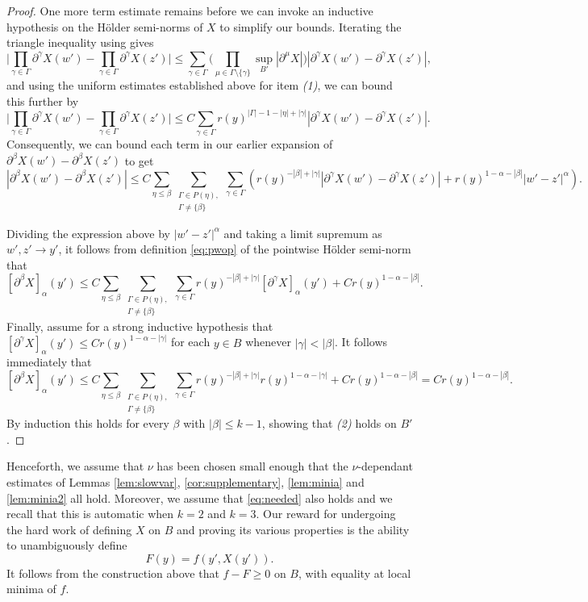 \documentclass[oneside,hidelinks,indentfirst,10pt]{book}
\begin{document}
\begin{proof}
One more term estimate remains before we can invoke an inductive hypothesis on the H\"older semi-norms of \(X\) to simplify our bounds. Iterating the triangle inequality using  gives
\[
    \bigg|\prod_{\gamma\in\Gamma}\partial^\gamma X(w')-\prod_{\gamma\in\Gamma}\partial^\gamma X(z')\bigg|\leq \sum_{\gamma\in\Gamma}\bigg(\prod_{\mu\in\Gamma\setminus\{\gamma\}}\sup_{B'}|\partial^\mu X|\bigg)|\partial^\gamma X(w')-\partial^\gamma X(z')|,
\]
and using the uniform estimates established above for item \textit{(1)}, we can bound this further by
\[
    \bigg|\prod_{\gamma\in\Gamma}\partial^\gamma X(w')-\prod_{\gamma\in\Gamma}\partial^\gamma X(z')\bigg|\leq C\sum_{\gamma\in\Gamma}r(y)^{|\Gamma|-1-|\eta|+|\gamma|}|\partial^\gamma X(w')-\partial^\gamma X(z')|. 
\]
Consequently, we can bound each term in our earlier expansion of \(\partial^\beta X(w')-\partial^\beta X(z')\) to get
\[
    |\partial^\beta X(w')-\partial^\beta X(z')|\leq C\sum_{\eta\leq\beta}\sum_{ \substack{\Gamma\in P(\eta),\\\Gamma\neq \{\beta\}}}\sum_{\gamma\in\Gamma}(r(y)^{-|\beta|+|\gamma|}|\partial^\gamma X(w')-\partial^\gamma X(z')|+r(y)^{1-\alpha-|\beta|}|w'-z'|^\alpha).
\]


Dividing the expression above by \(|w'-z'|^\alpha\) and taking a limit supremum as \(w',z'\rightarrow y'\), it follows from definition \eqref{eq:pwop} of the pointwise H\"older semi-norm that
\[
    [\partial^\beta X]_\alpha(y')\leq C\sum_{\eta\leq\beta}\sum_{ \substack{\Gamma\in P(\eta),\\\Gamma\neq \{\beta\}}}\sum_{\gamma\in\Gamma}r(y)^{-|\beta|+|\gamma|}[\partial^\gamma X]_\alpha(y')+Cr(y)^{1-\alpha-|\beta|}.
\]
Finally, assume for a strong inductive hypothesis that \([\partial^\gamma X]_{\alpha}(y')\leq Cr(y)^{1-\alpha-|\gamma|}\) for each \(y\in B\) whenever \(|\gamma|<|\beta|\). It follows immediately that
\[
    [\partial^\beta X]_\alpha(y')\leq C\sum_{\eta\leq\beta}\sum_{ \substack{\Gamma\in P(\eta),\\\Gamma\neq \{\beta\}}}\sum_{\gamma\in\Gamma}r(y)^{-|\beta|+|\gamma|}r(y)^{1-\alpha-|\gamma|}+Cr(y)^{1-\alpha-|\beta|}=Cr(y)^{1-\alpha-|\beta|}.
\]
By induction this holds for every \(\beta\) with \(|\beta|\leq k-1\), showing that \textit{(2)} holds on \(B'\).
\end{proof}


Henceforth, we assume that \(\nu\) has been chosen small enough that the \(\nu\)-dependant estimates of Lemmas \ref{lem:slowvar}, \ref{cor:supplementary}, \ref{lem:minia} and \ref{lem:minia2} all hold. Moreover, we assume that \eqref{eq:needed} also holds and we recall that this is automatic when \(k=2\) and \(k=3\). Our reward for undergoing the hard work of defining \(X\) on \(B\) and proving its various properties is the ability to unambiguously define
\[
    F(y)=f(y',X(y')).
\]
It follows from the construction above that \(f-F\geq 0\) on \(B\), with equality at local minima of \(f\). 
\end{document}
